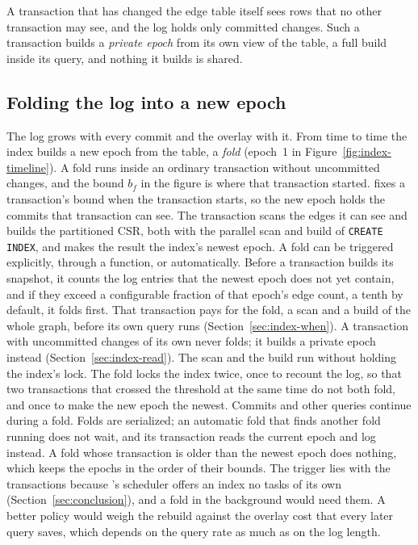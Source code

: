 A transaction that has changed the edge table itself sees rows that no other transaction may see, and the log holds
only committed changes. Such a transaction builds a \emph{private epoch} from its own view of the table, a full build
inside its query, and nothing it builds is shared.

\subsection{Folding the log into a new epoch}
\label{sec:index-fold}

The log grows with every commit and the overlay with it. From time to time the index builds a new epoch from the
table, a \emph{fold} (epoch~1 in Figure~\ref{fig:index-timeline}). A fold runs inside an ordinary transaction without uncommitted changes, and the bound $b_f$ in the figure is
where that transaction started. \duckdb fixes a transaction's bound when the transaction starts, so the new epoch
holds the commits that transaction can see. The transaction scans the edges it can see and builds the partitioned CSR, both with the parallel scan and
build of \texttt{CREATE INDEX}, and makes the result the index's newest epoch. A fold
can be triggered explicitly, through a function, or automatically. Before a transaction builds its snapshot, it counts
the log entries that the newest epoch does not yet contain, and if they exceed a configurable fraction of that epoch's
edge count, a tenth by default, it folds first. That transaction pays for the fold, a scan and a build of the whole
graph, before its own query runs (Section~\ref{sec:index-when}). A transaction with uncommitted changes of its own never folds; it builds a private epoch instead
(Section~\ref{sec:index-read}). The scan and the build run without holding the index's lock. The fold locks the index
twice, once to recount the log, so that two transactions that crossed the threshold at the same time do not both
fold, and once to make the new epoch the newest. Commits and other queries continue during a fold.
Folds are serialized; an automatic fold that finds another fold running does not wait, and its transaction reads the
current epoch and log instead. A fold whose transaction is older than the newest epoch does nothing, which keeps the epochs in the order of
their bounds. The trigger lies with the transactions because \duckdb's scheduler offers an index no tasks of its own (Section~\ref{sec:conclusion}), and a fold in the background would need them. A better policy would weigh the rebuild against the overlay cost that every later query saves, which depends on the query rate as much as on the log length.

